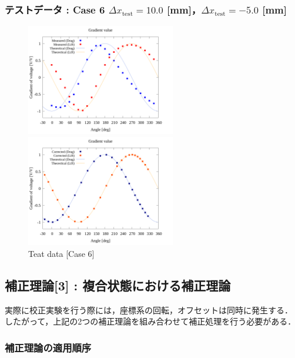 \subsubsection{テストデータ : Case 6 $\Delta x_\mathrm{test} = 10.0$ [mm]，$\Delta x_\mathrm{test} = -5.0$ [mm]}
\begin{figure}[htbp]
  \begin{minipage}[b]{0.45\linewidth}
    \centering
    \includegraphics[width=65mm]{../../02_workspace/result/offset_dx=10.0_dy=-5.0/plot/20/20_adjust-value.png}
  \end{minipage}
  \begin{minipage}[b]{0.45\linewidth}
    \centering
    \includegraphics[width=65mm]{../../02_workspace/result/offset_dx=10.0_dy=-5.0/plot/21/21-2_summary_offset.png}
  \end{minipage}
  \caption{Teat data [Case 6]}
\end{figure}

\subsection{補正理論[3] : 複合状態における補正理論}

実際に校正実験を行う際には，座標系の回転，オフセットは同時に発生する．
したがって，上記の2つの補正理論を組み合わせて補正処理を行う必要がある．

\subsubsection{補正理論の適用順序}

